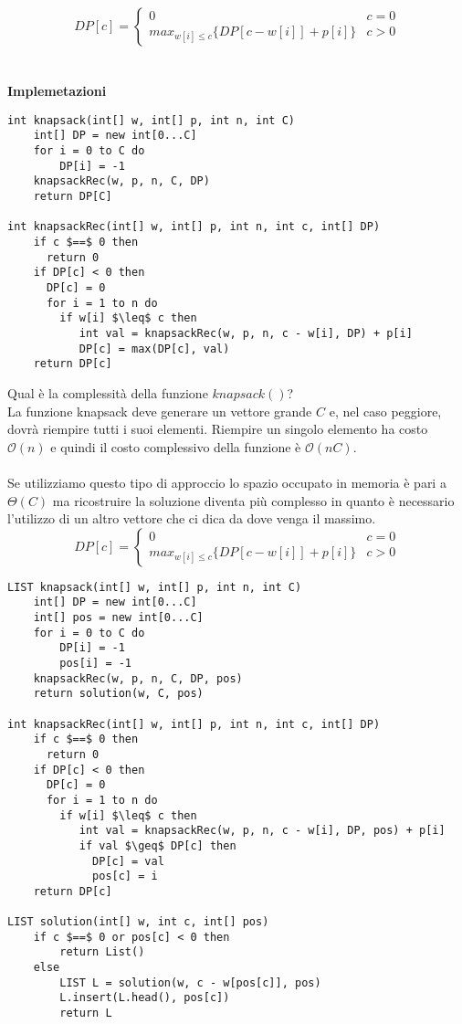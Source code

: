 \documentclass[../cheatSheetAlgoritmi.tex]{subfiles}
\begin{document}
\begin{equation*}
  	DP[c] =\begin{cases}
    	0 & \text{$c = 0$}\\
    	max_{w[i] \leq c}\{DP[c-w[i]]+p[i]\} & \text{$c>0$}
  	\end{cases}
\end{equation*}\\\\
\textbf{Implemetazioni}
\begin{lstlisting}[caption= Knapsack zaino senza limiti]
int knapsack(int[] w, int[] p, int n, int C)
	int[] DP = new int[0...C]
	for i = 0 to C do
		DP[i] = -1
	knapsackRec(w, p, n, C, DP)
	return DP[C]
	
int knapsackRec(int[] w, int[] p, int n, int c, int[] DP)
	if c $==$ 0 then
	  return 0
	if DP[c] < 0 then
	  DP[c] = 0
	  for i = 1 to n do
	    if w[i] $\leq$ c then
	  	   int val = knapsackRec(w, p, n, c - w[i], DP) + p[i]
	   	   DP[c] = max(DP[c], val)
	return DP[c]
\end{lstlisting}
Qual è la complessità della funzione $knapsack()$?\\
La funzione knapsack deve generare un vettore grande $C$ e, nel caso peggiore, dovrà riempire tutti i suoi elementi. Riempire un singolo elemento ha costo $\mathcal{O}(n)$ e quindi il costo complessivo della funzione è  $\mathcal{O}(nC)$.\\\\
Se utilizziamo questo tipo di approccio lo spazio occupato in memoria è pari a $\Theta(C)$ ma ricostruire la soluzione diventa più complesso in quanto è necessario l'utilizzo di un altro vettore che ci dica da dove venga il massimo.
\begin{equation*}
  	DP[c] =\begin{cases}
    	0 & \text{$c = 0$}\\
    	max_{w[i] \leq c}\{DP[c-w[i]]+p[i]\} & \text{$c>0$}
  	\end{cases}
\end{equation*}
\begin{lstlisting}[caption= Knapsack Ricostruzione Soluzione]
LIST knapsack(int[] w, int[] p, int n, int C)
	int[] DP = new int[0...C]
	int[] pos = new int[0...C]
	for i = 0 to C do
		DP[i] = -1
		pos[i] = -1
	knapsackRec(w, p, n, C, DP, pos)
	return solution(w, C, pos)
	
int knapsackRec(int[] w, int[] p, int n, int c, int[] DP)
	if c $==$ 0 then
	  return 0
	if DP[c] < 0 then
	  DP[c] = 0
	  for i = 1 to n do
	    if w[i] $\leq$ c then
	  	   int val = knapsackRec(w, p, n, c - w[i], DP, pos) + p[i]
	  	   if val $\geq$ DP[c] then
	   	     DP[c] = val
	   	     pos[c] = i
	return DP[c]
	
LIST solution(int[] w, int c, int[] pos)
	if c $==$ 0 or pos[c] < 0 then
		return List()
	else
		LIST L = solution(w, c - w[pos[c]], pos)
		L.insert(L.head(), pos[c])
		return L
\end{lstlisting}
\end{document}

